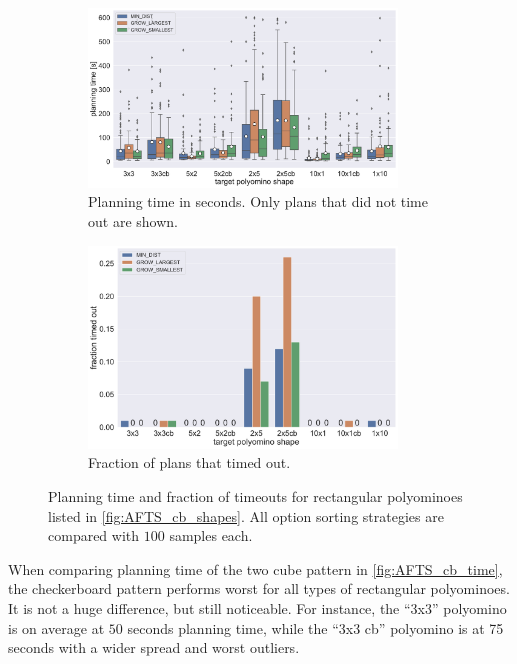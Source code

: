 \begin{figure}
	\centering
	\begin{subfigure}[b]{\textwidth}
		\centering
		\includegraphics[width=0.9\textwidth]{figures/plots/AFTS_cb_time.pdf}
		\caption{Planning time in seconds. Only plans that did not time out are shown.}
		\label{fig:AFTS_cb_time}
	\end{subfigure}
	
	\begin{subfigure}[b]{\textwidth}
		\centering
		\includegraphics[width=0.9\textwidth]{figures/plots/AFTS_cb_timeout.pdf}
		\caption{Fraction of plans that timed out.}
		\label{fig:AFTS_cb_timeout}
	\end{subfigure}
	\caption[Planning time and fraction of timeouts for rectangular polyominoes]{Planning time and fraction of timeouts for rectangular polyominoes listed in \autoref{fig:AFTS_cb_shapes}. All option sorting strategies are compared with $100$ samples each.}
	\label{fig:AFTS_cb_timestats}
\end{figure}

When comparing planning time of the two cube pattern in \autoref{fig:AFTS_cb_time}, the checkerboard pattern performs worst for all types of rectangular polyominoes.
It is not a huge difference, but still noticeable.
For instance, the ``3x3'' polyomino is on average at $50$ seconds planning time, while the ``3x3 cb'' polyomino is at 75 seconds with a wider spread and worst outliers.

